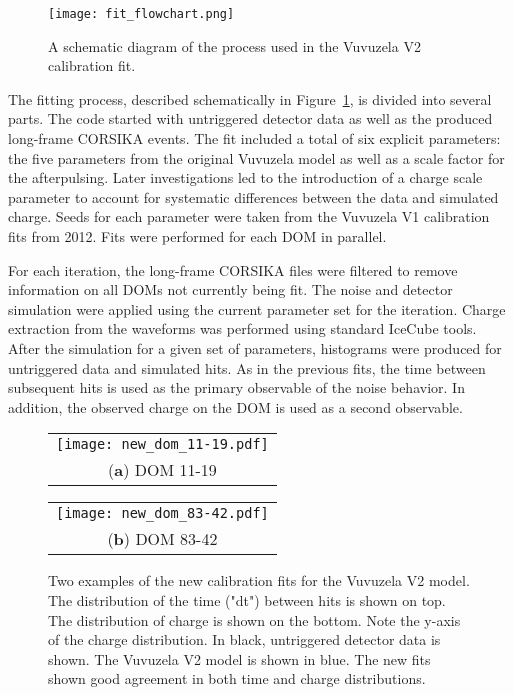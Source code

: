 \begin{landscape}
\centering
\begin{figure}
\texttt{[image: fit\_flowchart.png]} 
\caption{A schematic diagram of the process used in the Vuvuzela V2 calibration fit.}
\label{fig:fit_flowchart}
\end{figure}
\end{landscape}

The fitting process, described schematically in Figure~\ref{fig:fit_flowchart}, is divided into several parts. 
The code started with untriggered detector data as well as the produced long-frame CORSIKA events. 
The fit included a total of six explicit parameters: the five parameters from the original Vuvuzela model as well as a scale factor for the afterpulsing.
Later investigations led to the introduction of a charge scale parameter to account for systematic differences between the data and simulated charge.
Seeds for each parameter were taken from the Vuvuzela V1 calibration fits from 2012.
Fits were performed for each DOM in parallel.

For each iteration, the long-frame CORSIKA files were filtered to remove information on all DOMs not currently being fit.
The noise and detector simulation were applied using the current parameter set for the iteration.
Charge extraction from the waveforms was performed using standard IceCube tools.
After the simulation for a given set of parameters, histograms were produced for untriggered data and simulated hits.
As in the previous fits, the time between subsequent hits is used as the primary observable of the noise behavior.
In addition, the observed charge on the DOM is used as a second observable.

\begin{figure}[h]
\centering
\begin{tabular}[b]{c}
  \texttt{[image: new\_dom\_11-19.pdf]} \\
  \small (\textbf{\color{ctcolormain}a}) DOM 11-19
\end{tabular} \hspace{2pt}
\begin{tabular}[b]{c}
  \texttt{[image: new\_dom\_83-42.pdf]} \\
  \small (\textbf{\color{ctcolormain}b}) DOM 83-42
\end{tabular}
\caption{Two examples of the new calibration fits for the Vuvuzela V2 model. The distribution of the time ("dt") between hits is shown on top. The distribution of charge is shown on the bottom. Note the y-axis of the charge distribution. In black, untriggered detector data is shown. The Vuvuzela V2 model is shown in blue. The new fits shown good agreement in both time and charge distributions.}
\label{fig:new_vuvuzela_fits}
\end{figure}

